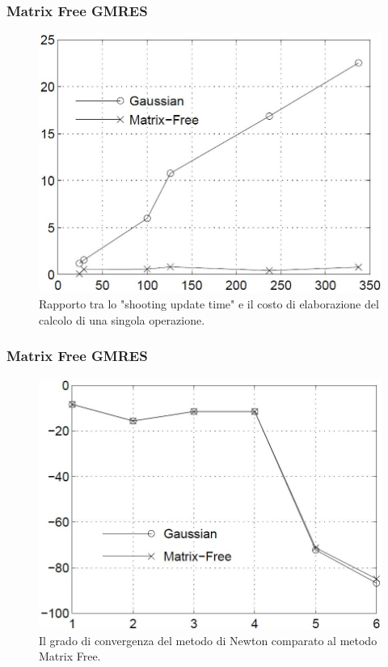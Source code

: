 \documentclass[10pt]{beamer}
\begin{document}
\begin{frame} \frametitle{Matrix Free GMRES}
\begin{figure}
    \centering
    \includegraphics[width=.75\linewidth]{Figura1.JPG}
    \caption{Rapporto tra lo "shooting update time" e il costo di elaborazione del calcolo di una singola operazione.}
\end{figure}

\end{frame}


\begin{frame} \frametitle{Matrix Free GMRES}
\begin{figure}
    \centering
    \includegraphics[width=.75\linewidth]{Figura2.JPG}
    \caption{Il grado di convergenza del metodo di Newton comparato al metodo Matrix Free.}
\end{figure}
\end{frame}
\end{document}
